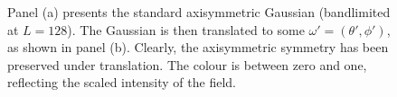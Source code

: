 \begin{figure}[htp]
	\centering
	\hfill
	\caption{
		Panel (a) presents the standard axisymmetric Gaussian (bandlimited at \(L=128\)).
		The Gaussian is then translated to some \(\omega'=(\theta',\phi')\), as shown in panel (b).
		Clearly, the axisymmetric symmetry has been preserved under translation.
		The colour is between zero and one, reflecting the scaled intensity of the field.
	}\label{fig:chapter2_gaussian}
\end{figure}
